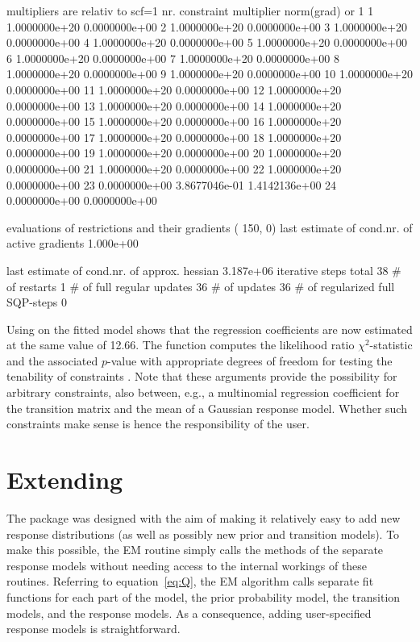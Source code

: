 \documentclass[article]{jss}
\begin{document}
\begin{Schunk}
\begin{Soutput}
  multipliers are relativ to scf=1
  nr.    constraint     multiplier norm(grad) or 1 
    1   1.0000000e+20    0.0000000e+00 
    2   1.0000000e+20    0.0000000e+00 
    3   1.0000000e+20    0.0000000e+00 
    4   1.0000000e+20    0.0000000e+00 
    5   1.0000000e+20    0.0000000e+00 
    6   1.0000000e+20    0.0000000e+00 
    7   1.0000000e+20    0.0000000e+00 
    8   1.0000000e+20    0.0000000e+00 
    9   1.0000000e+20    0.0000000e+00 
   10   1.0000000e+20    0.0000000e+00 
   11   1.0000000e+20    0.0000000e+00 
   12   1.0000000e+20    0.0000000e+00 
   13   1.0000000e+20    0.0000000e+00 
   14   1.0000000e+20    0.0000000e+00 
   15   1.0000000e+20    0.0000000e+00 
   16   1.0000000e+20    0.0000000e+00 
   17   1.0000000e+20    0.0000000e+00 
   18   1.0000000e+20    0.0000000e+00 
   19   1.0000000e+20    0.0000000e+00 
   20   1.0000000e+20    0.0000000e+00 
   21   1.0000000e+20    0.0000000e+00 
   22   1.0000000e+20    0.0000000e+00 
   23   0.0000000e+00    3.8677046e-01    1.4142136e+00
   24   0.0000000e+00    0.0000000e+00 

 evaluations of restrictions and their gradients
 (   150,     0)
 last estimate of cond.nr. of active gradients   1.000e+00

 last estimate of cond.nr. of approx.  hessian   3.187e+06
iterative steps total              38
# of restarts                       1
# of full regular updates          36
# of updates                       36
# of regularized full SQP-steps     0
\end{Soutput}
\end{Schunk}

Using  on the fitted model shows that the regression 
coefficients are now estimated at the same value of 12.66. The function
 computes the likelihood ratio $\chi^2$-statistic and the
associated $p$-value with appropriate degrees of freedom for testing the
tenability of constraints \citep{Dannemann2007}. Note that these arguments 
provide the possibility for arbitrary 
constraints, also between, e.g., a multinomial regression coefficient 
for the transition matrix and the mean of a Gaussian response model. 
Whether such constraints make sense is hence the responsibility of 
the user. 

\section[Extending depmixS4]{Extending }

The  package was designed with the aim of making it
relatively easy to add new response distributions (as well as possibly
new prior and transition models).  To make this possible, the EM
routine simply calls the  methods of the separate response
models without needing access to the internal workings of these
routines.  Referring to equation~\ref{eq:Q}, the EM algorithm calls
separate fit functions for each part of the model, the prior
probability model, the transition models, and the response models.  As
a consequence, adding user-specified response models is
straightforward.
\end{document}
